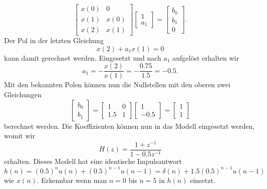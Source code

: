 \begin{beispiel}
\begin{enumerate}
\begin{equation}\left[\begin{array}{ll}
x(0) & 0 \\
x(1) & x(0) \\
x(2) & x(1)
\end{array}\right]\left[\begin{array}{c}
1 \\
a_1
\end{array}\right]=\left[\begin{array}{c}
b_0 \\
b_1\\
0
\end{array}\right].\end{equation}
Der Pol in der letzten Gleichung 
\begin{equation}
x(2)+a_1 x(1)=0
\end{equation}
kann damit gerechnet werden.
Eingesetzt und nach $a_1$ aufgelöst erhalten wir
\begin{equation}
a_1=-\frac{x(2)}{x(1)}=
-\frac{0.75}{1.5}=
-0.5.
\end{equation}
Mit den bekannten Polen können nun die Nullstellen mit den oberen zwei Gleichungen 
\begin{equation}\left[\begin{array}{c}
b_0 \\
b_1
\end{array}\right]=\left[\begin{array}{cc}
1 & 0 \\
1.5 & 1
\end{array}\right]\left[\begin{array}{c}
1 \\
-0.5
\end{array}\right]=\left[\begin{array}{l}
1 \\
1
\end{array}\right]\end{equation}
berechnet werden.
Die Koeffizienten können nun in das Modell eingesetzt werden, womit wir
\begin{equation}
H(z)=\frac{1+z^{-1}}{1-0.5 z^{-1}}
\end{equation}
erhalten.
Dieses Modell hat eine identische Impulsantwort 
\begin{equation}
h(n)=(0.5)^{n} u(n)+(0.5)^{n-1} u(n-1)
=
\delta(n)+1.5(0.5)^{n-1} u(n-1)\end{equation}
wie $x(n)$.
Erkennbar wenn man $n=0$ bis $n=5$ in $h(n)$ einsetzt.
\begin{align*}

\end{align*}
\end{enumerate}
\end{beispiel}
